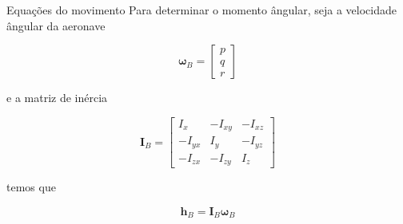 \documentclass{beamer}
\newcommand{\jindent}{\justifying\setlength{\parindent}{1.5em}}
\begin{document}
\begin{frame}{Equações do movimento}
    \jindent
    Para determinar o momento ângular, seja a velocidade ângular da aeronave
    
    \begin{equation*}
        \boldsymbol{\omega}_B =
            \begin{bmatrix}
            p \\ q \\ r 
            \end{bmatrix}
    \end{equation*}

    \justifying
    e a matriz de inércia
    
    \begin{equation*}
        \mathbf I_B =
        \begin{bmatrix}
        I_x   & -I_{xy} & -I_{xz} \\
        -I_{yx} & I_y   & -I_{yz} \\
        -I_{zx} & -I_{zy} & I_z
        \end{bmatrix}
    \end{equation*}

    \justifying
    temos que

    \begin{equation*}
        \mathbf{h}_B = \mathbf{I}_B \boldsymbol{\omega}_B
    \end{equation*}
    
\end{frame}


\end{document}
